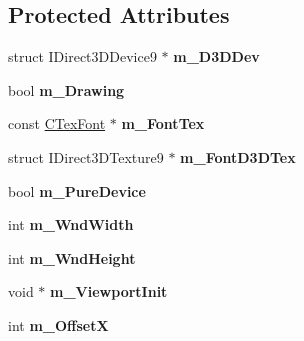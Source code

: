\subsection*{Protected Attributes}
\begin{DoxyCompactItemize}
\item 
\hypertarget{class_c_tw_graph_direct3_d9_a17f7d8d3888555072b71d554c6fd94b7}{struct I\+Direct3\+D\+Device9 $\ast$ {\bfseries m\+\_\+\+D3\+D\+Dev}}\label{class_c_tw_graph_direct3_d9_a17f7d8d3888555072b71d554c6fd94b7}

\item 
\hypertarget{class_c_tw_graph_direct3_d9_a871c2d29ca0fac3d78b2d8d229f036ac}{bool {\bfseries m\+\_\+\+Drawing}}\label{class_c_tw_graph_direct3_d9_a871c2d29ca0fac3d78b2d8d229f036ac}

\item 
\hypertarget{class_c_tw_graph_direct3_d9_a82110ba5a81b961ac85182b36063262b}{const \hyperlink{struct_c_tex_font}{C\+Tex\+Font} $\ast$ {\bfseries m\+\_\+\+Font\+Tex}}\label{class_c_tw_graph_direct3_d9_a82110ba5a81b961ac85182b36063262b}

\item 
\hypertarget{class_c_tw_graph_direct3_d9_ace58bbe5743ea55ec7a62660fc5711eb}{struct I\+Direct3\+D\+Texture9 $\ast$ {\bfseries m\+\_\+\+Font\+D3\+D\+Tex}}\label{class_c_tw_graph_direct3_d9_ace58bbe5743ea55ec7a62660fc5711eb}

\item 
\hypertarget{class_c_tw_graph_direct3_d9_a6596f78d6bc4f9b0bf57b3db166b17c5}{bool {\bfseries m\+\_\+\+Pure\+Device}}\label{class_c_tw_graph_direct3_d9_a6596f78d6bc4f9b0bf57b3db166b17c5}

\item 
\hypertarget{class_c_tw_graph_direct3_d9_a9d72bbfe02d1025f4eb74467de5e9e86}{int {\bfseries m\+\_\+\+Wnd\+Width}}\label{class_c_tw_graph_direct3_d9_a9d72bbfe02d1025f4eb74467de5e9e86}

\item 
\hypertarget{class_c_tw_graph_direct3_d9_afa841b3ae32fe6851f738d98f79d09d5}{int {\bfseries m\+\_\+\+Wnd\+Height}}\label{class_c_tw_graph_direct3_d9_afa841b3ae32fe6851f738d98f79d09d5}

\item 
\hypertarget{class_c_tw_graph_direct3_d9_a427d5274cb63ce25d1bf27c611b24bf9}{void $\ast$ {\bfseries m\+\_\+\+Viewport\+Init}}\label{class_c_tw_graph_direct3_d9_a427d5274cb63ce25d1bf27c611b24bf9}

\item 
\hypertarget{class_c_tw_graph_direct3_d9_a2e8f4be86029f791c9a03f62dc514f83}{int {\bfseries m\+\_\+\+Offset\+X}}\label{class_c_tw_graph_direct3_d9_a2e8f4be86029f791c9a03f62dc514f83}


\end{DoxyCompactItemize}
